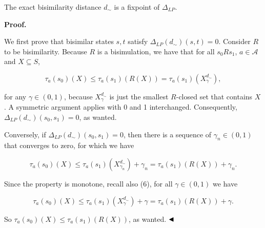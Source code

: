  
The exact bisimilarity distance $d_{\sim}$ is a fixpoint of $\Delta_{LP}$.\par
 
 
 
 
 
\par\medskip\noindent\textbf{Proof.}\par
 
 
We first prove that bisimilar states $s,t$ satisfy $\Delta_{LP}(d_{\sim})(s,t)=0$. Consider $R$ to be bisimilarity. Because $R$ is a bisimulation, we have that for all $s_{0}Rs_{1}$, $a\in\mathcal{A}$ and $X\subseteq S$,\par
  
\par  \quad  \[\tau_{a}(s_{0})(X)\leq\tau_{a}(s_{1})(R(X))=\tau_{a}(s_{1})(X^{d_{\sim}}_{\gamma}),\]\quad  \quad  
  
for any $\gamma\in(0,1)$, because $X^{d_{\sim}}_{\gamma}$ is just the smallest $R$-closed set that contains $X$. A symmetric argument applies with 0 and 1 interchanged. Consequently, $\Delta_{LP}(d_{\sim})(s_{0},s_{1})=0$, as wanted.\par
 
 
 
Conversely, if $\Delta_{LP}(d_{\sim})(s_{0},s_{1})=0$, then there is a sequence of $\gamma_{n}\in(0,1)$ that converges to zero, for which we have\par
  
\par  \quad  \[\tau_{a}(s_{0})(X)\leq\tau_{a}(s_{1})(X^{d_{\sim}}_{\gamma_{n}})+\gamma_{n}=\tau_{a}(s_{1})(R(X))+\gamma_{n}.\]\quad  \quad  
  
Since the property is monotone, recall also (6), for all $\gamma\in(0,1)$ we have\par
  
\par  \quad  \[\tau_{a}(s_{0})(X)\leq\tau_{a}(s_{1})(X^{d_{\sim}}_{\gamma})+\gamma=\tau_{a}(s_{1})(R(X))+\gamma.\]\quad  \quad  
  
So $\tau_{a}(s_{0})(X)\leq\tau_{a}(s_{1})(R(X))$, as wanted. $\hfill\blacktriangleleft$\par
 
